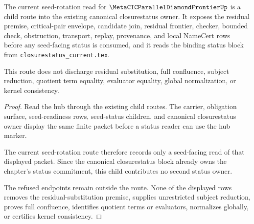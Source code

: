 \begin{theorem}
\label{thm:metacic-parallel-diamond-frontier-seed-rotation-current-status}
The current seed-rotation read for $\MetaCICParallelDiamondFrontierUp$ is a child route into the existing canonical closurestatus owner. It exposes the residual premise, critical-pair envelope, candidate join, residual frontier, checker, bounded check, obstruction, transport, replay, provenance, and local NameCert rows before any seed-facing status is consumed, and it reads the binding status block from \texttt{closurestatus\_current.tex}.

This route does not discharge residual substitution, full confluence, subject reduction, quotient term equality, evaluator equality, global normalization, or kernel consistency.
\end{theorem}
\begin{proof}
Read the hub through the existing child routes. The carrier, obligation surface, seed-readiness rows, seed-status children, and canonical closurestatus owner display the same finite packet before a status reader can use the hub marker.

The current seed-rotation route therefore records only a seed-facing read of that displayed packet. Since the canonical closurestatus block already owns the chapter's status commitment, this child contributes no second status owner.

The refused endpoints remain outside the route. None of the displayed rows removes the residual-substitution premise, supplies unrestricted subject reduction, proves full confluence, identifies quotient terms or evaluators, normalizes globally, or certifies kernel consistency.
\end{proof}
